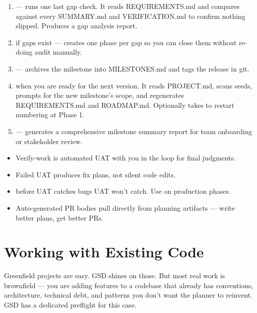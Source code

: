 \documentclass[11pt,letterpaper,openany]{book}
\begin{document}
\begin{enumerate}[itemsep=2pt]
  \item {} --- runs one last gap check. It reads REQUIREMENTS.md and compares against every SUMMARY.md and VERIFICATION.md to confirm nothing slipped. Produces a gap analysis report.
  \item {} if gaps exist --- creates one phase per gap so you can close them without re-doing audit manually.
  \item {} --- archives the milestone into MILESTONES.md and tags the release in git.
  \item {} when you are ready for the next version. It reads PROJECT.md, scans seeds, prompts for the new milestone's scope, and regenerates REQUIREMENTS.md and ROADMAP.md. Optionally takes  to restart numbering at Phase 1.
  \item {} --- generates a comprehensive milestone summary report for team onboarding or stakeholder review.
\end{enumerate}

\begin{gsdnote}[title=Key Takeaways]
\begin{itemize}[itemsep=2pt,leftmargin=1.2em]
  \item Verify-work is automated UAT with you in the loop for final judgments.
  \item Failed UAT produces fix plans, not silent code edits.
  \item {} before UAT catches bugs UAT won't catch. Use  on production phases.
  \item Auto-generated PR bodies pull directly from planning artifacts --- write better plans, get better PRs.
\end{itemize}
\end{gsdnote}

\chapter{Working with Existing Code}

Greenfield projects are easy. GSD shines on those. But most real work is brownfield --- you are adding features to a codebase that already has conventions, architecture, technical debt, and patterns you don't want the planner to reinvent. GSD has a dedicated preflight for this case.
\end{document}
